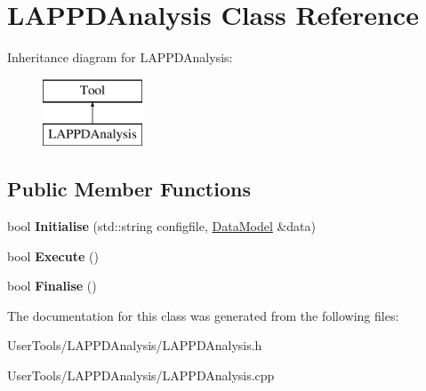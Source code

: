 \hypertarget{classLAPPDAnalysis}{\section{L\-A\-P\-P\-D\-Analysis Class Reference}
\label{classLAPPDAnalysis}
}
Inheritance diagram for L\-A\-P\-P\-D\-Analysis\-:\begin{figure}[H]
\begin{center}
\leavevmode
\includegraphics[height=2.000000cm]{classLAPPDAnalysis}
\end{center}
\end{figure}
\subsection*{Public Member Functions}
\begin{DoxyCompactItemize}
\item 
\hypertarget{classLAPPDAnalysis_a3777b97151a13ebc1be6054b057b7354}{bool {\bfseries Initialise} (std\-::string configfile, \hyperlink{classDataModel}{Data\-Model} \&data)}\label{classLAPPDAnalysis_a3777b97151a13ebc1be6054b057b7354}

\item 
\hypertarget{classLAPPDAnalysis_a0bda0e3aa26131d460e8f11ac2d2d50d}{bool {\bfseries Execute} ()}\label{classLAPPDAnalysis_a0bda0e3aa26131d460e8f11ac2d2d50d}

\item 
\hypertarget{classLAPPDAnalysis_acbda60c00d2f2bceca57ff9f9098e7a7}{bool {\bfseries Finalise} ()}\label{classLAPPDAnalysis_acbda60c00d2f2bceca57ff9f9098e7a7}

\end{DoxyCompactItemize}


The documentation for this class was generated from the following files\-:\begin{DoxyCompactItemize}
\item 
User\-Tools/\-L\-A\-P\-P\-D\-Analysis/L\-A\-P\-P\-D\-Analysis.\-h\item 
User\-Tools/\-L\-A\-P\-P\-D\-Analysis/L\-A\-P\-P\-D\-Analysis.\-cpp\end{DoxyCompactItemize}
